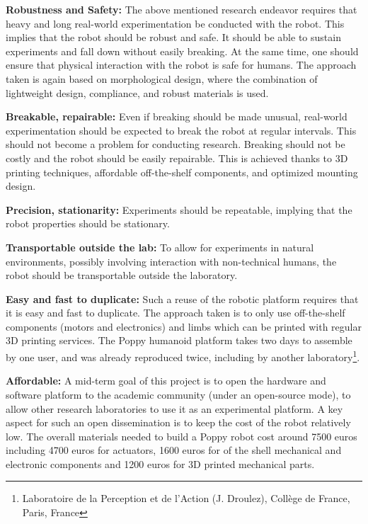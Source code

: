 \textbf{Robustness and Safety:} The above mentioned research endeavor requires that heavy and long real-world experimentation be conducted with the robot. This implies that the robot should be robust and safe. It should be able to sustain experiments and fall down without easily breaking. At the same time, one should ensure that physical interaction with the robot is safe for humans. The approach taken is again based on morphological design, where the combination of lightweight design, compliance, and robust materials is used.

\textbf{Breakable, repairable:} Even if breaking should be made unusual, real-world experimentation should be expected to break the robot at regular intervals. This should not become a problem for conducting research. Breaking should not be costly and the robot should be easily repairable. This is achieved thanks to 3D printing techniques, affordable off-the-shelf components, and optimized mounting design.

\textbf{Precision, stationarity:} Experiments should be repeatable, implying that the robot properties should be stationary.

\textbf{Transportable outside the lab:} To allow for experiments in natural environments, possibly involving interaction with non-technical humans, the robot should be transportable outside the laboratory.

\textbf{Easy and fast to duplicate:} Such a reuse of the robotic platform requires that it is easy and fast to duplicate. The approach taken is to only use off-the-shelf components (motors and electronics) and limbs which can be printed with regular 3D printing services. The Poppy humanoid platform takes two days to assemble by one user, and was already reproduced twice, including by another laboratory\footnote{Laboratoire de la Perception et de l'Action (J. Droulez), Collège de France, Paris, France\label{LPPA}}.

\textbf{Affordable:} A mid-term goal of this project is to open the hardware and software platform to the academic community (under an open-source mode), to allow other research laboratories to use it as an experimental platform. A key aspect for such an open dissemination is to keep the cost of the robot relatively low. The overall materials needed to build a Poppy robot cost around 7500 euros including 4700 euros for actuators, 1600 euros for of the shell mechanical and electronic components and 1200 euros for 3D printed mechanical parts.


